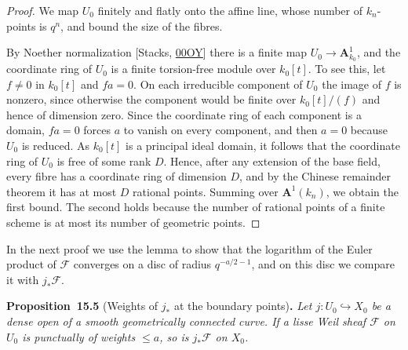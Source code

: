 \documentclass[11pt]{article}
\newenvironment{bpstatement}[2]{\par\addvspace{0.6\baselineskip}\noindent\textbf{#1}#2\textbf{.}\enspace\ignorespaces}
  {\par\addvspace{0.4\baselineskip}}
\newenvironment{bpstatementit}[2]{\begin{bpstatement}{#1}{#2}\itshape\ignorespaces}{\end{bpstatement}}
\begin{document}
\begin{proof}[{Proof}]\label{bp132}%
We map \(U_0\) finitely and flatly onto the affine line, whose number of \(k_n\)-points is \(q^n\), and bound the size of the fibres.

By Noether normalization [Stacks, \href{https://stacks.math.columbia.edu/tag/00OY}{00OY}] there is a finite map \(U_0\to\mathbf A^1_{k_0}\), and the coordinate ring of \(U_0\) is a finite torsion-free module over \(k_0[t]\). To see this, let \(f\ne0\) in \(k_0[t]\) and \(fa=0\). On each irreducible component of \(U_0\) the image of \(f\) is nonzero, since otherwise the component would be finite over \(k_0[t]/(f)\) and hence of dimension zero. Since the coordinate ring of each component is a domain, \(fa=0\) forces \(a\) to vanish on every component, and then \(a=0\) because \(U_0\) is reduced.  As \(k_0[t]\) is a principal ideal domain, it follows that the coordinate ring of \(U_0\) is free of some rank \(D\).  Hence, after any extension of the base field, every fibre has a coordinate ring of dimension \(D\), and by the Chinese remainder theorem it has at most \(D\) rational points.  Summing over \(\mathbf A^1(k_n)\), we obtain the first bound.  The second holds because the number of rational points of a finite scheme is at most its number of geometric points.
\end{proof}

\label{bp133}%
In the next proof we use the lemma to show that the logarithm of the Euler product of \(\mathcal F\) converges on a disc of radius \(q^{-a/2-1}\), and on this disc we compare it with \(j_*\mathcal F\).

\label{bp134}%
\begin{bpstatementit}{Proposition~15.5}{ (Weights of $j_*$ at the boundary points)}
Let \(j:U_0\hookrightarrow X_0\) be a dense open of a smooth geometrically connected curve.  If a lisse Weil sheaf \(\mathcal F\) on \(U_0\) is punctually of weights \(\le a\), so is \(j_*\mathcal F\) on \(X_0\).
\end{bpstatementit}
\end{document}
